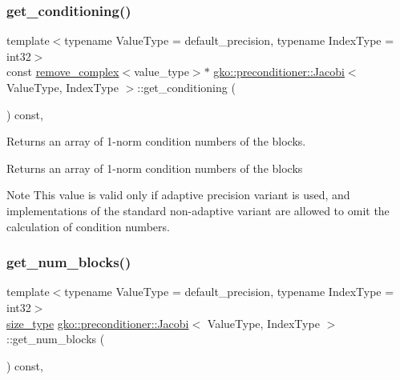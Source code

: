 \subsubsection{\texorpdfstring{get\+\_\+conditioning()}{get\_conditioning()}}
{\footnotesize\ttfamily template$<$typename Value\+Type  = default\+\_\+precision, typename Index\+Type  = int32$>$ \\
const \hyperlink{namespacegko_adfcb75c44f6b6c701989419c166f6e7e}{remove\+\_\+complex}$<$value\+\_\+type$>$$\ast$ \hyperlink{classgko_1_1preconditioner_1_1Jacobi}{gko\+::preconditioner\+::\+Jacobi}$<$ Value\+Type, Index\+Type $>$\+::get\+\_\+conditioning (\begin{DoxyParamCaption}{ }\end{DoxyParamCaption}) const\hspace{0.3cm}{\ttfamily [inline]}, {\ttfamily [noexcept]}}



Returns an array of 1-\/norm condition numbers of the blocks. 

\begin{DoxyReturn}{Returns}
an array of 1-\/norm condition numbers of the blocks
\end{DoxyReturn}
\begin{DoxyNote}{Note}
This value is valid only if adaptive precision variant is used, and implementations of the standard non-\/adaptive variant are allowed to omit the calculation of condition numbers. 
\end{DoxyNote}
\mbox{\label{classgko_1_1preconditioner_1_1Jacobi_afb44d8e560f00f65c46c6813638ce24c}} 
\subsubsection{\texorpdfstring{get\+\_\+num\+\_\+blocks()}{get\_num\_blocks()}}
{\footnotesize\ttfamily template$<$typename Value\+Type  = default\+\_\+precision, typename Index\+Type  = int32$>$ \\
\hyperlink{namespacegko_a6e5c95df0ae4e47aab2f604a22d98ee7}{size\+\_\+type} \hyperlink{classgko_1_1preconditioner_1_1Jacobi}{gko\+::preconditioner\+::\+Jacobi}$<$ Value\+Type, Index\+Type $>$\+::get\+\_\+num\+\_\+blocks (\begin{DoxyParamCaption}{ }\end{DoxyParamCaption}) const\hspace{0.3cm}{\ttfamily [inline]}, {\ttfamily [noexcept]}}



